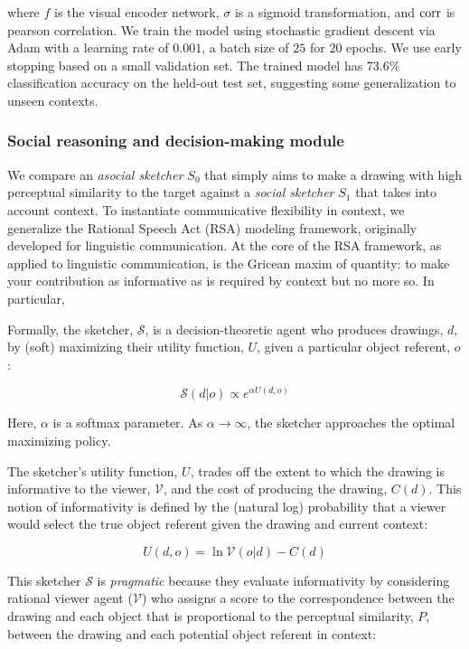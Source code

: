 \documentclass[9pt,twocolumn,twoside]{pnas-new}
\begin{document}
{where $f$ is the visual encoder network, $\sigma$ is a sigmoid transformation, and $\textup{corr}$ is pearson correlation. We train the model using stochastic gradient descent via Adam with a learning rate of $0.001$, a batch size of $25$ for $20$ epochs. We use early stopping based on a small validation set. The trained model has 73.6\% classification accuracy on the held-out test set, suggesting some generalization to unseen contexts.


\subsubsection*{Social reasoning and decision-making module}

We compare an \emph{asocial sketcher} $S_0$ that simply aims to make a drawing with high perceptual similarity to the target against a \emph{social sketcher} $S_1$ that takes into account context. To instantiate communicative flexibility in context, we generalize the Rational Speech Act (RSA) modeling framework, originally developed for linguistic communication. At the core of the RSA framework, as applied to linguistic communication, is the Gricean maxim of quantity: to make your contribution as informative as is required by context but no more so. In particular,

Formally, the sketcher, $\mathcal{S}$, is a decision-theoretic agent who produces drawings, $d$, by (soft) maximizing their utility function, $U$, given a particular object referent, $o$:

\begin{equation}
\mathcal{S}(d|o) \propto e^{\alpha U(d,o)}
\end{equation}

Here, $\alpha$ is a softmax parameter. As $\alpha \rightarrow \infty$, the sketcher approaches the optimal maximizing policy.

The sketcher's utility function, $U$, trades off the extent to which the drawing is informative to the viewer, $\mathcal{V}$, and the cost of producing the drawing, $C(d)$. This notion of informativity is defined by the (natural log) probability that a viewer would select the true object referent given the drawing and current context:

\begin{equation} \label{sketcher_utility}
U(d, o) = \ln \mathcal{V}(o|d) - C(d)
\end{equation}

This sketcher $\mathcal{S}$ is \emph{pragmatic} because they evaluate informativity by considering rational viewer agent ($\mathcal{V}$) who assigns a score to the correspondence between the drawing and each object that is proportional to the perceptual similarity, $P$, between the drawing and each potential object referent in context:

}
\end{document}
